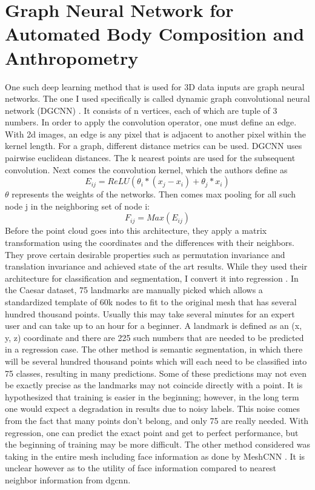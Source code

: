 \section{Graph Neural Network for Automated Body Composition and Anthropometry}
One such deep learning method that is used for 3D data inputs are graph neural networks. The one I used specifically is called dynamic graph convolutional neural network (DGCNN) \cite{DBLP:journals/corr/abs-1801-07829}. It consists of n vertices, each of which are tuple of 3 numbers. In order to apply the convolution operator, one must define an edge. With 2d images, an edge is any pixel that is adjacent to another pixel within the kernel length. For a graph, different distance metrics can be used. DGCNN uses pairwise euclidean distances. The k nearest points are used for the subsequent convolution. Next comes the convolution kernel, which the authors define as
\begin{equation}
	E_{ij} = ReLU(\theta_i * (x_j - x_i) + \theta_j * x_i)
\end{equation}
$\theta$ represents the weights of the networks. Then comes max pooling for all such node j in the neighboring set of node i:
\begin{equation}
F_{ij} = Max(E_{ij})
\end{equation}
Before the point cloud goes into this architecture, they apply a matrix transformation using the coordinates and the differences with their neighbors.
They prove certain desirable properties such as permutation invariance and translation invariance and achieved state of the art results.
While they used their architecture for classification and segmentation, I convert it into regression . In the Caesar dataset, 75 landmarks are manually picked which allows a standardized template of 60k nodes to fit to the original mesh that has several hundred thousand points. Usually this may take several minutes for an expert user and can take up to an hour for a beginner.
A landmark is defined as an (x, y, z) coordinate and there are 225 such numbers that are needed to be predicted in a regression case. The other method is semantic segmentation, in which there will be several hundred thousand points which will each need to be classified into 75 classes, resulting in many predictions. Some of these predictions may not even be exactly precise as the landmarks may not coincide directly with a point. It is hypothesized that training is easier in the beginning; however, in the long term one would expect a degradation in results due to noisy labels. This noise comes from the fact that many points don't belong, and only 75 are really needed. With regression, one can predict the exact point and get to perfect performance, but the beginning of training may be more difficult.
The other method considered was taking in the entire mesh including face information as done by MeshCNN \cite{hanocka2019meshcnn}. It is unclear however as to the utility of face information compared to nearest neighbor information from dgcnn.

